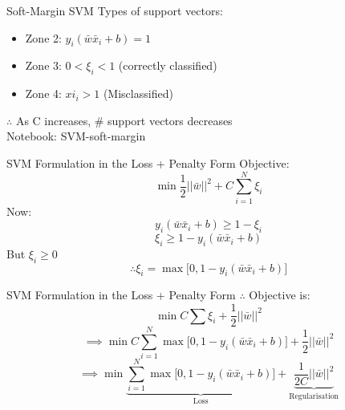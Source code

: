 \documentclass{beamer}
\begin{document}
	\begin{frame}{Soft-Margin SVM}
		Types of support vectors:
		\begin{itemize}
			\item Zone 2: $y_{i}(\bar{w}\bar{x}_{i} + b) = 1$
			\item Zone 3: $0 < \xi_{i} < 1$ (correctly classified)
			\item Zone 4: $xi_{i} > 1$ (Misclassified)
		\end{itemize}
		$\therefore$ As C increases, \# support vectors decreases \\
		\vspace{1cm}
		Notebook: SVM-soft-margin
	\end{frame}
	\begin{frame}{SVM Formulation in the Loss + Penalty Form}
		Objective:
		$$\min \frac{1}{2}\lvert\lvert\bar{w}\rvert\rvert^{2} + C\sum_{i=1}^{N}\xi_{i}$$
		Now:
		$$y_{i}(\bar{w}\bar{x}_{i} + b) \geq 1 - \xi_{i}$$
		$$\xi_{i} \geq 1 - y_{i}(\bar{w}\bar{x}_{i} + b)$$
		But $\xi_{i} \geq 0$ \\
		$$\therefore \xi_{i} = \max \big[0, 1 - y_{i}(\bar{w}\bar{x}_{i} + b)\big]$$
	\end{frame}
	\begin{frame}{SVM Formulation in the Loss + Penalty Form}
		$\therefore$ Objective is:
		$$\min C \sum \xi_{i} + \frac{1}{2}\lvert\lvert\bar{w}\rvert\rvert^{2}$$
		$$\implies \min C \sum_{i=1}^{N} \max\big[0, 1 - y_{i}(\bar{w}\bar{x}_{i} + b)\big] + \frac{1}{2}\lvert\lvert\bar{w}\rvert\rvert^{2}$$
		$$\implies \min \underbrace{\sum_{i=1}^{N}\max \big[0, 1-y_{i}(\bar{w}\bar{x}_{i} + b)\big]}_\text{Loss} + \underbrace{ \frac{1}{2C}\lvert\lvert\bar{w}\rvert\rvert^{2}}_\text{Regularisation}$$
	\end{frame}
	

{
	
}
\end{document}
